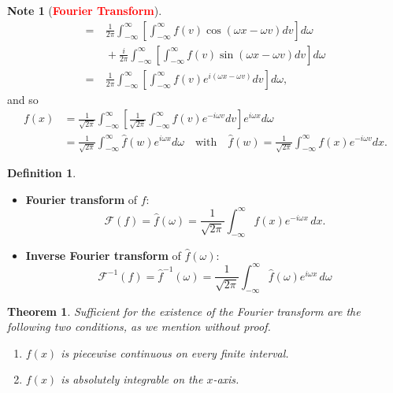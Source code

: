 \documentclass[12pt,openany]{book}
\newtheorem{theorem}{Theorem}[chapter]
\theoremstyle{definition}
\newtheorem{definition}{Definition}[chapter]
\newtheorem*{note}{Note}
\begin{document}
\begin{note}[\textcolor{red}{\bf Fourier Transform}]
\begin{align*}
			=&\ \frac{1}{2\pi} \int_{-\infty}^{\infty} \left[ \int_{-\infty}^{\infty} f(v) \cos(\omega x - \omega v) dv \right] d\omega\\
			&\ +\frac{i}{2\pi} \int_{-\infty}^{\infty} \left[ \int_{-\infty}^{\infty} f(v) \sin(\omega x - \omega v) dv \right] d\omega\\
			=&\ \frac{1}{2\pi} \int_{-\infty}^{\infty} \left[ \int_{-\infty}^{\infty} f(v) e^{i (\omega x - \omega v)} dv \right] d\omega,
		\end{align*}
		and so
		\begin{align*}
			f(x) &= \frac{1}{\sqrt{2\pi}} \int_{-\infty}^{\infty} \left[ \frac{1}{\sqrt{2\pi}} \int_{-\infty}^{\infty} f(v) e^{-i \omega v} dv \right] e^{i \omega x} d\omega\\
			&=\frac{1}{\sqrt{2\pi}} \int_{-\infty}^{\infty} \hat{f}(w) e^{i \omega x} d\omega\quad\text{with}\quad\hat{f}(w)=\frac{1}{\sqrt{2\pi}} \int_{-\infty}^{\infty} f(x) e^{-i \omega v} dx.
		\end{align*}
	\end{note}
	\newpage
	\begin{tcolorbox}[colframe=defcolor, title={\color{white}\bf Fourier and Inverse Fourier Transforms}]
		\begin{definition}
			\ \begin{itemize}
				\item \textbf{Fourier transform} of \(f\):
				\[ \mathcal{F}(f) = \hat{f}(\omega) = \frac{1}{\sqrt{2\pi}} \int_{-\infty}^{\infty} f(x)e^{-i\omega x} \, dx. \]
				\item \textbf{Inverse Fourier transform} of \(\hat{f}(\omega)\):
				\[ \mathcal{F}^{-1}(f) = \hat{f}^{-1}(\omega) = \frac{1}{\sqrt{2\pi}} \int_{-\infty}^{\infty} \hat{f}(\omega)e^{i\omega x} \, d\omega \]
			\end{itemize}
		\end{definition}
	\end{tcolorbox}
	\vspace{12pt}
	\begin{tcolorbox}[colframe=thmcolor, title={\color{white}\bf Existence of the Fourier Transform}]
		\begin{theorem}
			Sufficient for the existence of the Fourier transform are the following two conditions, as we mention without proof.
			\begin{enumerate}[(1)]
				\item \( f(x) \) is piecewise continuous on every finite interval.
				\item \( f(x) \) is absolutely integrable on the \( x \)-axis.
			\end{enumerate}
		\end{theorem}
	\end{tcolorbox}
\end{document}
